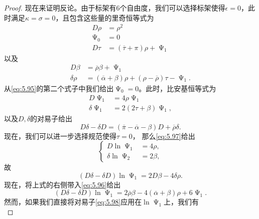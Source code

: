 \begin{proof}
	现在来证明反论。由于标架有$6$个自由度，我们可以选择标架使得$\epsilon =0$，此时满足$\kappa =\sigma =0$，且包含这些量的里奇恒等式为
	\begin{equation}
		\begin{aligned}
			D\rho  & =\rho ^{2}\\
			\upPsi _{0} & =0\\
			D\tau  & =(\overline{\tau } +\pi )\rho +\upPsi _{1}
		\end{aligned}
	\end{equation}
	以及
	\begin{equation}
		\begin{aligned}
			D\beta  & =\overline{\rho } \beta +\upPsi _{1}\\
			\delta \rho  & =(\overline{\alpha } +\beta )\rho +(\rho -\overline{\rho } )\tau -\upPsi _{1} .
		\end{aligned}
	\end{equation}
	从\ref{eq:5.95}的第二个式子中我们给出$\upPsi _{0} =0$。此时，比安基恒等式为
	\begin{equation}
		\begin{aligned}
			D\upPsi _{1} & =4\rho \upPsi _{1}\\
			\delta \upPsi _{1} & =2(2\tau +\beta )\upPsi _{1} ,
		\end{aligned}
	\end{equation}
	以及$D,\delta $的对易子给出
	\begin{equation}
		D\delta -\delta D=(\overline{\pi } -\overline{\alpha } -\beta )D+\overline{\rho } \delta .
	\end{equation}
	现在，我们可以进一步选择规范使得$\tau =0$， 那么\ref{eq:5.97}给出
	\begin{equation*}
		\begin{cases}
			D\ln \upPsi _{1} & =4\rho ,\\
			\delta \ln \upPsi _{2} & =2\beta ,
		\end{cases}
	\end{equation*}
	故
	\begin{equation*}
		(D\delta -\delta D)\ln \upPsi _{1} =2D\beta -4\delta \rho .
	\end{equation*}
	现在，将上式的右侧带入\ref{eq:5.96}给出
	\begin{equation}
		(D\delta -\delta D)\ln \upPsi _{1} =2\overline{\rho } \beta -4(\overline{\alpha } +\beta )\rho +6\upPsi _{1} .
	\end{equation}
	然而，如果我们直接将对易子\ref{eq:5.98}应用在$\ln \upPsi _{1}$上，我们有
	\begin{equation}

\end{equation}
\end{proof}
